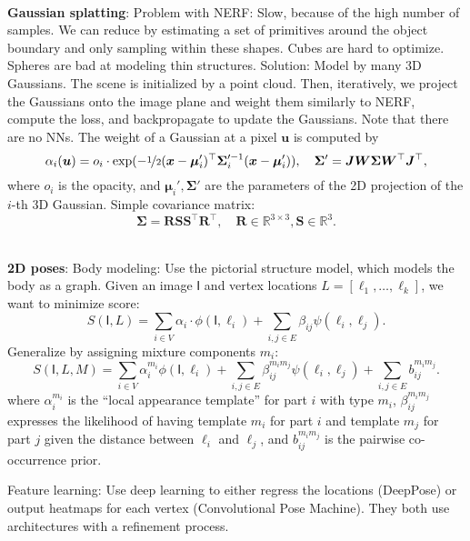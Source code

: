 \documentclass{article}
\newcommand{\R}{\mathbb{R}}
\renewcommand{\vec}[1]{\bm{#1}}
\newcommand{\mat}[1]{\bm{#1}}
\newcommand{\tens}[1]{\bm{\mathsf{#1}}}
\newenvironment{topic}[1]
{\textbf{\sffamily \colorbox{black}{\rlap{\textbf{\textcolor{white}{#1}}}\hspace{\linewidth}\hspace{-2\fboxsep}}} \\ \vspace{0.2cm}}
{}
\begin{document}
\begin{multicols*}{2}
\begin{topic}{Implicit surfaces and neural radiance fields}
        \textbf{Gaussian splatting}: Problem with NERF: Slow, because of the high number of samples.
        We can reduce by estimating a set of primitives around the object boundary and only sampling
        within these shapes. Cubes are hard to optimize. Spheres are bad at modeling thin structures.
        Solution: Model by many 3D Gaussians. The scene is initialized by a point cloud. Then,
        iteratively, we project the Gaussians onto the image plane and weight them similarly to NERF,
        compute the loss, and backpropagate to update the Gaussians. Note that there are no
        NNs. The weight of a Gaussian at a pixel $\vec{u}$ is computed by \[
            \alpha_i(\vec{u}) = o_i \cdot \exp ( -\nicefrac{1}{2} (\vec{x} - \vec{\mu}_i')^\top \mat{\Sigma}_i'^{-1} (\vec{x} - \vec{\mu}_i')), \quad \mat{\Sigma}' = \mat{J} \mat{W} \mat{\Sigma} \mat{W}^\top \mat{J}^\top,
        \]
        where $o_i$ is the opacity, and $\vec{\mu}_i', \mat{\Sigma}'$ are the parameters of the 2D
        projection of the $i$-th 3D Gaussian. Simple covariance matrix: \[
            \mat{\Sigma} = \mat{R} \mat{S} \mat{S}^\top \mat{R}^\top, \quad \mat{R} \in \R^{3\times 3}, \mat{S} \in \R^3.
        \]

    \end{topic}

    \begin{topic}{Parametric human body models}
        \textbf{2D poses}: Body modeling: Use the pictorial structure model, which models the body
        as a graph. Given an image $\tens{I}$ and vertex locations $L = [\ell_1, \ldots, \ell_k]$, we want
        to minimize score: \[
            S(\tens{I}, L) = \sum_{i\in V} \alpha_i \cdot \phi(\tens{I}, \ell_i) + \sum_{i,j \in E} \beta_{ij} \psi(\ell_i, \ell_j).
        \]
        Generalize by assigning mixture components $m_i$: \[
            S(\tens{I}, L, M) = \sum_{i\in V} \alpha_i^{m_i} \phi(\tens{I}, \ell_i) + \sum_{i,j \in E} \beta_{ij}^{m_im_j} \psi(\ell_i,\ell_j) + \sum_{i,j \in E} b_{ij}^{m_im_j}.
        \]
        where $\alpha^{m_i}_i$ is the ``local appearance template'' for part $i$ with type $m_i$,
        $\beta^{m_im_j}_{ij}$ expresses the likelihood of having template $m_i$ for part $i$ and template
        $m_j$ for part $j$ given the distance between $\ell_i$ and $\ell_j$, and $b_{ij}^{m_im_j}$ is the
        pairwise co-occurrence prior.

        Feature learning: Use deep learning to either regress the locations (DeepPose) or output heatmaps
        for each vertex (Convolutional Pose Machine). They both use architectures with a refinement
        process.


\end{topic}
\end{multicols*}
\end{document}
